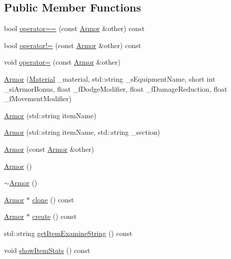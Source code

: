 \subsection*{Public Member Functions}
\begin{DoxyCompactItemize}
\item 
bool \mbox{\hyperlink{class_armor_a400f558650400d25fc5fc3031a455c46}{operator==}} (const \mbox{\hyperlink{class_armor}{Armor}} \&other) const
\item 
bool \mbox{\hyperlink{class_armor_a912e1ad6bfe7509c66c2c4966cf5188c}{operator!=}} (const \mbox{\hyperlink{class_armor}{Armor}} \&other) const
\item 
void \mbox{\hyperlink{class_armor_ad706d994c7d3a3ea4d7c1728faccc0aa}{operator=}} (const \mbox{\hyperlink{class_armor}{Armor}} \&other)
\item 
\mbox{\hyperlink{class_armor_a4a33d37eb11165792cce7035dfb2ff93}{Armor}} (\mbox{\hyperlink{class_material}{Material}} \+\_\+material, std\+::string \+\_\+s\+Equipment\+Name, short int \+\_\+si\+Armor\+Bonus, float \+\_\+f\+Dodge\+Modifier, float \+\_\+f\+Damage\+Reduction, float \+\_\+f\+Movement\+Modifier)
\item 
\mbox{\hyperlink{class_armor_a6e58e27c6b7550a8baf7fb1b2167d6cc}{Armor}} (std\+::string item\+Name)
\item 
\mbox{\hyperlink{class_armor_a1a1bc35d82ebba3f5a81f9e40d93f3c9}{Armor}} (std\+::string item\+Name, std\+::string \+\_\+section)
\item 
\mbox{\hyperlink{class_armor_a40d54a621183a93edaecb2cd4e83c800}{Armor}} (const \mbox{\hyperlink{class_armor}{Armor}} \&other)
\item 
\mbox{\hyperlink{class_armor_a23323e95bbeb488eb6fe54cbd83d49a2}{Armor}} ()
\item 
\mbox{\hyperlink{class_armor_a1cb22d4e87d0ec24a30de40873632945}{$\sim$\+Armor}} ()
\item 
\mbox{\hyperlink{class_armor}{Armor}} $\ast$ \mbox{\hyperlink{class_armor_aac8aec108de9a8a45bada1534c0f23b7}{clone}} () const
\item 
\mbox{\hyperlink{class_armor}{Armor}} $\ast$ \mbox{\hyperlink{class_armor_a21de0acaa6ecdb6f5937166b83da9b01}{create}} () const
\item 
std\+::string \mbox{\hyperlink{class_armor_a731bb4d1fe53070f30a336db82fada2c}{get\+Item\+Examine\+String}} () const
\item 
void \mbox{\hyperlink{class_armor_a4fe1507d7aaf280a18e19f51a6f8c42d}{show\+Item\+Stats}} () const
\item 

\end{DoxyCompactItemize}
